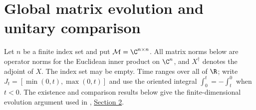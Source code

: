\section{Global matrix evolution and unitary comparison}
\label{sec:unitary_evolution}

Let $n$ be a finite index set and put $\mathcal M=\C^{n\times n}$.
All matrix norms below are operator norms for the Euclidean inner product
on $\C^n$, and $X^\dagger$ denotes the adjoint of $X$.
The index set may be empty. Time ranges over all of $\R$; write
$J_t=[\min(0,t),\max(0,t)]$ and use the oriented integral
$\int_0^t=-\int_t^0$ when $t<0$.
The existence and comparison results below give the finite-dimensional
evolution argument used in \cite{OpenAI2026PolynomialPEPS},
\href{https://github.com/openai/math/blob/adc7f1241b42e322a6451854ab7e4b4c146bf78a/preprints/Polynomial-PEPS-approximation-of-gapped-square-grid-ground-states-September-24-2026/build/sections/02-information.tex\#L513-L536}{Section 2}.

